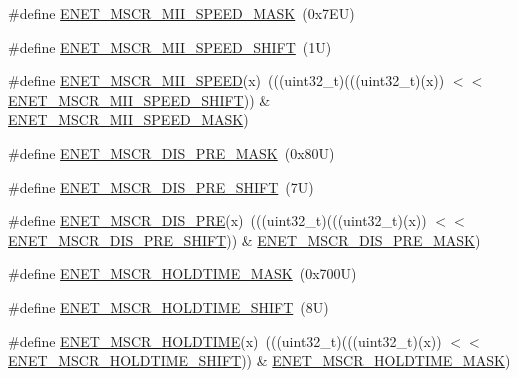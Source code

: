 \begin{DoxyCompactItemize}
\item 
\#define \mbox{\hyperlink{group___e_n_e_t___register___masks_ga1cb1a68c64288642ffaba2a5866990cc}{E\+N\+E\+T\+\_\+\+M\+S\+C\+R\+\_\+\+M\+I\+I\+\_\+\+S\+P\+E\+E\+D\+\_\+\+M\+A\+SK}}~(0x7\+E\+U)
\item 
\#define \mbox{\hyperlink{group___e_n_e_t___register___masks_ga82d16561cec7a3078e68de4d7c9c72f2}{E\+N\+E\+T\+\_\+\+M\+S\+C\+R\+\_\+\+M\+I\+I\+\_\+\+S\+P\+E\+E\+D\+\_\+\+S\+H\+I\+FT}}~(1\+U)
\item 
\#define \mbox{\hyperlink{group___e_n_e_t___register___masks_ga99659f5579cf09698781ff2928e82e2e}{E\+N\+E\+T\+\_\+\+M\+S\+C\+R\+\_\+\+M\+I\+I\+\_\+\+S\+P\+E\+ED}}(x)~(((uint32\+\_\+t)(((uint32\+\_\+t)(x)) $<$$<$ \mbox{\hyperlink{group___e_n_e_t___register___masks_ga82d16561cec7a3078e68de4d7c9c72f2}{E\+N\+E\+T\+\_\+\+M\+S\+C\+R\+\_\+\+M\+I\+I\+\_\+\+S\+P\+E\+E\+D\+\_\+\+S\+H\+I\+FT}})) \& \mbox{\hyperlink{group___e_n_e_t___register___masks_ga1cb1a68c64288642ffaba2a5866990cc}{E\+N\+E\+T\+\_\+\+M\+S\+C\+R\+\_\+\+M\+I\+I\+\_\+\+S\+P\+E\+E\+D\+\_\+\+M\+A\+SK}})
\item 
\#define \mbox{\hyperlink{group___e_n_e_t___register___masks_ga9387f22e8849499571e0755718ff4d73}{E\+N\+E\+T\+\_\+\+M\+S\+C\+R\+\_\+\+D\+I\+S\+\_\+\+P\+R\+E\+\_\+\+M\+A\+SK}}~(0x80\+U)
\item 
\#define \mbox{\hyperlink{group___e_n_e_t___register___masks_gaa4bd1e56f919591ae627d376271da560}{E\+N\+E\+T\+\_\+\+M\+S\+C\+R\+\_\+\+D\+I\+S\+\_\+\+P\+R\+E\+\_\+\+S\+H\+I\+FT}}~(7\+U)
\item 
\#define \mbox{\hyperlink{group___e_n_e_t___register___masks_ga8083b321dd03c4e6880a9b84b52997b1}{E\+N\+E\+T\+\_\+\+M\+S\+C\+R\+\_\+\+D\+I\+S\+\_\+\+P\+RE}}(x)~(((uint32\+\_\+t)(((uint32\+\_\+t)(x)) $<$$<$ \mbox{\hyperlink{group___e_n_e_t___register___masks_gaa4bd1e56f919591ae627d376271da560}{E\+N\+E\+T\+\_\+\+M\+S\+C\+R\+\_\+\+D\+I\+S\+\_\+\+P\+R\+E\+\_\+\+S\+H\+I\+FT}})) \& \mbox{\hyperlink{group___e_n_e_t___register___masks_ga9387f22e8849499571e0755718ff4d73}{E\+N\+E\+T\+\_\+\+M\+S\+C\+R\+\_\+\+D\+I\+S\+\_\+\+P\+R\+E\+\_\+\+M\+A\+SK}})
\item 
\#define \mbox{\hyperlink{group___e_n_e_t___register___masks_gaf0be3bf4ebe6e922406c96f80faf3481}{E\+N\+E\+T\+\_\+\+M\+S\+C\+R\+\_\+\+H\+O\+L\+D\+T\+I\+M\+E\+\_\+\+M\+A\+SK}}~(0x700\+U)
\item 
\#define \mbox{\hyperlink{group___e_n_e_t___register___masks_ga78800fa8f2240e5d4c1ce06aa39a822e}{E\+N\+E\+T\+\_\+\+M\+S\+C\+R\+\_\+\+H\+O\+L\+D\+T\+I\+M\+E\+\_\+\+S\+H\+I\+FT}}~(8\+U)
\item 
\#define \mbox{\hyperlink{group___e_n_e_t___register___masks_ga334350e40871b467d4f021a32485cdc2}{E\+N\+E\+T\+\_\+\+M\+S\+C\+R\+\_\+\+H\+O\+L\+D\+T\+I\+ME}}(x)~(((uint32\+\_\+t)(((uint32\+\_\+t)(x)) $<$$<$ \mbox{\hyperlink{group___e_n_e_t___register___masks_ga78800fa8f2240e5d4c1ce06aa39a822e}{E\+N\+E\+T\+\_\+\+M\+S\+C\+R\+\_\+\+H\+O\+L\+D\+T\+I\+M\+E\+\_\+\+S\+H\+I\+FT}})) \& \mbox{\hyperlink{group___e_n_e_t___register___masks_gaf0be3bf4ebe6e922406c96f80faf3481}{E\+N\+E\+T\+\_\+\+M\+S\+C\+R\+\_\+\+H\+O\+L\+D\+T\+I\+M\+E\+\_\+\+M\+A\+SK}})
\end{DoxyCompactItemize}
